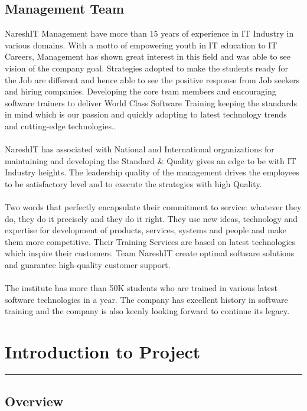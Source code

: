 \section {Management Team}
NareshIT Management have more than 15 years of experience in IT Industry in various domains.  With a motto of empowering youth in IT education to IT Careers, Management has shown great interest in this field and was able to see vision of the company goal.  Strategies adopted to make the students ready for the Job are different and hence able to see the positive response from Job seekers and hiring companies.  Developing the core team members and encouraging software trainers to deliver World Class Software Training keeping the standards in mind which is our passion and quickly adopting to latest technology trends and cutting-edge technologies..
\\
\\
NareshIT has associated with National and International organizations for maintaining and developing the Standard & Quality gives an edge to be with IT Industry heights.  The leadership quality of the management drives the employees to be satisfactory level and to execute the strategies with high Quality.
\\
\\
Two words that perfectly encapsulate their commitment to service: whatever they do, they do it precisely and they do it right. They use new ideas, technology and expertise for development of products, services, systems and people and make them more competitive. Their Training Services are based on latest technologies which inspire their customers. Team NareshIT create optimal software solutions and guarantee high-quality customer support.
\\
\\
The institute has more than 50K students who are trained in various latest software technologies in a year. The company has excellent history in software training and the company is also keenly looking forward to continue its legacy.

\chapter{Introduction to Project}\hrule
\label{Chapter:2}
\section{Overview}

